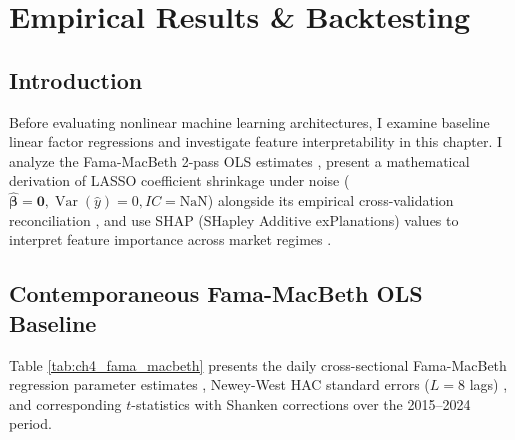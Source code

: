 \chapter{Empirical Results \& Backtesting}
\label{ch:empirical_results}

\section{Introduction}
Before evaluating nonlinear machine learning architectures, I examine baseline linear factor regressions and investigate feature interpretability in this chapter. I analyze the Fama-MacBeth 2-pass OLS estimates \citep{fama1973risk, newey1987simple}, present a mathematical derivation of LASSO coefficient shrinkage under noise ($\hat{\boldsymbol{\beta}} = \mathbf{0}, \operatorname{Var}(\hat{y})=0, IC = \text{NaN}$) alongside its empirical cross-validation reconciliation \citep{tibshirani1996regression, kozak2020shrinking}, and use SHAP (SHapley Additive exPlanations) values to interpret feature importance across market regimes \citep{lundberg2017unified, gu2020empirical}.

\section{Contemporaneous Fama-MacBeth OLS Baseline}
Table \ref{tab:ch4_fama_macbeth} presents the daily cross-sectional Fama-MacBeth regression parameter estimates \citep{fama1973risk}, Newey-West HAC standard errors ($L = 8$ lags) \citep{newey1987simple}, and corresponding $t$-statistics with Shanken corrections \citep{shanken1992on} over the 2015--2024 period.

\begin{table}[htbp]
\centering
\caption{Fama-MacBeth Daily Cross-Sectional Regression Risk Premia (2015--2024)}
\label{tab:ch4_fama_macbeth}
\end{table}

